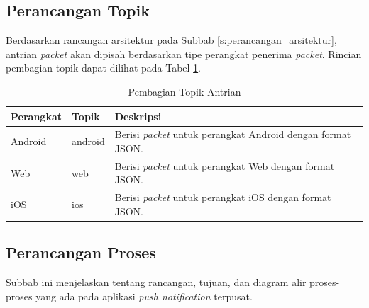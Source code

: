 \subsection{Perancangan Topik}
\par Berdasarkan rancangan arsitektur pada Subbab \ref{s:perancangan_arsitektur}, antrian \textit{packet} akan dipisah berdasarkan tipe perangkat penerima \textit{packet}. Rincian pembagian topik dapat dilihat pada Tabel \ref{t:pembagian_topik_antrian}.
\begin{longtable}{|p{2cm}|p{2cm}|p{5cm}|}
	\caption{Pembagian Topik Antrian} \label{t:pembagian_topik_antrian} \\ \hline
	\textbf{Perangkat} & \textbf{Topik} & \textbf{Deskripsi} \\ \hline
	Android & android & Berisi \textit{packet} untuk perangkat Android dengan format JSON. \\ \hline
	Web & web & Berisi \textit{packet} untuk perangkat Web dengan format JSON. \\ \hline
	iOS & ios & Berisi \textit{packet} untuk perangkat iOS dengan format JSON. \\ \hline
\end{longtable}

\subsection{Perancangan Proses}
\par Subbab ini menjelaskan tentang rancangan, tujuan, dan diagram alir proses-proses yang ada pada aplikasi \textit{push notification} terpusat.

